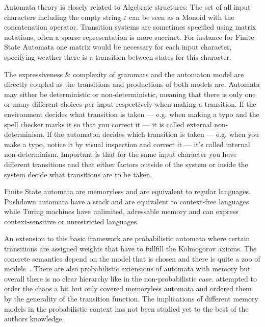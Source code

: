 \documentclass[11pt, rgb]{scrartcl}
\begin{document}
Automata theory is closely related to Algebraic structures: 
The set of all input characters including the empty string $\varepsilon$ can be seen as a Monoid with the concatenation operator.
Transition systems are sometimes specified using matrix notations, often a sparse representation is more succinct.
For instance for Finite State Automata one matrix would be necessary for each input character, specifying weather there is a transition between states for this character.

The expressiveness \& complexity of grammars and the automaton model are directly coupled as the transitions and productions of both models are. 
Automata may either be deterministic or non-deterministic, meaning that there is only one or many different choices per input respectively when making a transition. 
If the environment decides what transition is taken --- e.g. when making a typo and the spell checker marks it so that you correct it --- it is called external non-determinism. 
If the automaton decides which transition is taken --- e.g. when you make a typo, notice it by visual inspection and correct it --- it's called internal non-determinism. 
Important is that for the same input character you have different transitions and that either factors outside of the system or inside the system decide what transitions are to be taken. 


Finite State automata are memoryless and are equivalent to regular languages. 
Pushdown automata have a stack and are equivalent to context-free languages while Turing machines have unlimited, adressable memory and can express context-sensitive or unrestricted languages.


An extension to this basic framework are probabilistic automata where certain transitions are assigned weights that have to fullfill the Kolmogorov axioms.
The concrete semantics depend on the model that is chosen and there is quite a zoo of models~\autocite{sokolova}.
There are also probabilistic extensions of automata with memory but overall there is no clear hierarchy like in the non-probabilistic case. 
\autocite{sokolova} attempted to order the chaos a bit but only covered memoryless automata and ordered them by the generality of the transition function. 
The implications of different memory models in the probabilistic context has not been studied yet to the best of the authors knowledge. 
\end{document}

